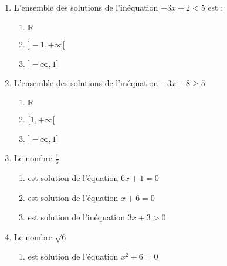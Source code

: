 \documentclass[oneside,twocolumn,landscape]{book}
\begin{document}
\begin{enumerate}




\item L'ensemble des solutions de l'inéquation $-3 x+2<5$ est :

\begin{enumerate}

\item\MauvaiseReponse $\mathbb{R}$

\item\BonneReponse $]-1,+\infty[$

\item\MauvaiseReponse $]-\infty, 1]$

\end{enumerate}

\item L'ensemble des solutions de l'inéquation $-3x+8 \geqslant 5$

\begin{enumerate}

\item\MauvaiseReponse $\mathbb{R}$

\item\MauvaiseReponse $[1,+\infty[$

\item\BonneReponse $]-\infty,1]$

\end{enumerate}





\item Le nombre $\frac{1}{6}$

\begin{enumerate}

\item\MauvaiseReponse est solution de l'équation $6x+1=0$

\item\MauvaiseReponse est solution de l'équation $x+6=0$

\item\BonneReponse est solution de l'inéquation $3x+3>0$

\end{enumerate}



\item Le nombre $\sqrt{6}$

\begin{enumerate}

\item\MauvaiseReponse est solution de l'équation $x^{2}+6=0$


\end{enumerate}
\end{enumerate}
\end{document}
